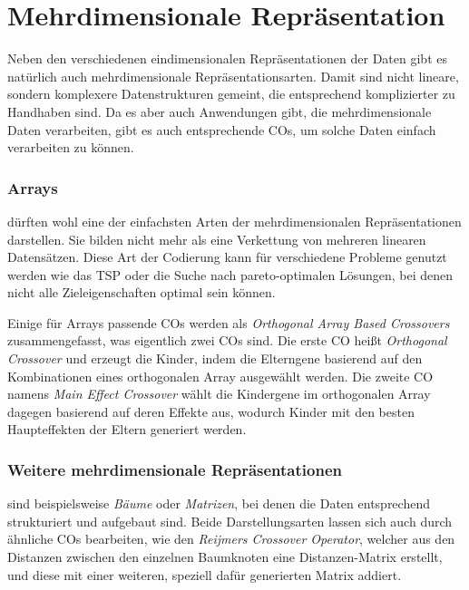 
\section{Mehrdimensionale Repräsentation}
\label{sec:MehrdimRep}

	Neben den verschiedenen eindimensionalen Repräsentationen der Daten gibt es natürlich auch mehrdimensionale Repräsentationsarten. Damit sind nicht lineare, sondern komplexere Datenstrukturen gemeint, die entsprechend kom\-pli\-zier\-ter zu Handhaben sind. Da es aber auch Anwendungen gibt, die mehrdimensionale Daten verarbeiten, gibt es auch entsprechende COs, um solche Daten einfach verarbeiten zu können.
	
	\subsubsection{Arrays}
	\label{sec:Arrays}
	
		dürften wohl eine der einfachsten Arten der mehrdimensionalen Re\-prä\-sen\-ta\-ti\-on\-en darstellen. Sie bilden nicht mehr als eine Verkettung von mehreren linearen Datensätzen. Diese Art der Codierung kann für verschiedene Probleme genutzt werden wie \zB das TSP oder die Suche nach pareto-optimalen Lösungen, bei denen nicht alle Zieleigenschaften optimal sein können.
		
		Einige für Arrays passende COs werden als \textit{Orthogonal Array Based Cross\-overs} zusammengefasst, was eigentlich zwei COs sind. Die erste CO heißt \textit{Orthogonal Crossover} und erzeugt die Kinder, indem die Elterngene basierend auf den Kombinationen eines orthogonalen Array ausgewählt werden. Die zweite CO namens \textit{Main Effect Crossover}  wählt die Kindergene im orthogonalen Array dagegen basierend auf deren Effekte aus, wodurch Kinder mit den besten Haupteffekten der Eltern generiert werden. \cite{ArrayCrossover}
	
	\subsubsection{Weitere mehrdimensionale Repräsentationen}
	\label{sec:WeitereMehrdim}
	
		sind beispielsweise \textit{Bäume} oder \textit{Matrizen}, bei denen die Daten entsprechend strukturiert und aufgebaut sind. Beide Darstellungsarten lassen sich \uA auch durch ähnliche COs bearbeiten, wie \zB den \textit{Reijmers Crossover Operator}, welcher aus den Distanzen zwischen den einzelnen Baumknoten eine Distanzen-Matrix erstellt, und diese mit einer weiteren, speziell dafür generierten Matrix addiert. \cite{MatrixCO}

